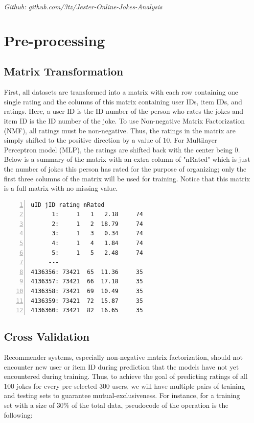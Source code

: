 \documentclass[12pt]{article}
\begin{document}
\textit{Github: github.com/3tz/Jester-Online-Jokes-Analysis}

\section{Pre-processing}

  \subsection{Matrix Transformation}

    \quad First, all datasets are transformed into a matrix with each row containing one single rating and the columns of this matrix containing user IDs, item IDs, and ratings. Here, a user ID is the ID number of the person who rates the jokes and item ID is the ID number of the joke. To use Non-negative Matrix Factorization (NMF), all ratings must be non-negative. Thus, the ratings in the matrix are simply shifted to the positive direction by a value of 10. For Multilayer Perceptron model (MLP), the ratings are shifted back with the center being 0. Below is a summary of the matrix with an extra column of "nRated" which is just the number of jokes this person has rated for the purpose of organizing; only the first three columns of the matrix will be used for training. Notice that this matrix is a full matrix with no missing value.

    \lstset{language = R, upquote=true}
    \begin{lstlisting}[basicstyle=\small\tt, numbers=left]
           uID jID rating nRated
      1:     1   1   2.18     74
      2:     1   2  18.79     74
      3:     1   3   0.34     74
      4:     1   4   1.84     74
      5:     1   5   2.48     74
     ---
4136356: 73421  65  11.36     35
4136357: 73421  66  17.18     35
4136358: 73421  69  10.49     35
4136359: 73421  72  15.87     35
4136360: 73421  82  16.65     35
    \end{lstlisting}

  \subsection{Cross Validation}

    \quad Recommender systems, especially non-negative matrix factorization, should not encounter new user or item ID during prediction that the models have not yet encountered during training. Thus, to achieve the goal of predicting ratings of all 100 jokes for every pre-selected 300 users, we will have multiple pairs of training and testing sets to guarantee mutual-exclusiveness. For instance, for a training set with a size of 30$\%$ of the total data, pseudocode of the operation is the following:
\end{document}

